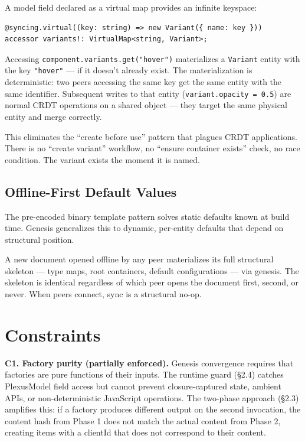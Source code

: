 A model field declared as a virtual map provides an infinite keyspace:

\begin{lstlisting}
@syncing.virtual((key: string) => new Variant({ name: key }))
accessor variants!: VirtualMap<string, Variant>;
\end{lstlisting}

Accessing \texttt{component.variants.get("hover")} materializes a \texttt{Variant} entity with the key \texttt{"hover"} --- if it doesn't already exist. The materialization is deterministic: two peers accessing the same key get the same entity with the same identifier. Subsequent writes to that entity (\texttt{variant.opacity = 0.5}) are normal CRDT operations on a shared object --- they target the same physical entity and merge correctly.

This eliminates the ``create before use'' pattern that plagues CRDT applications. There is no ``create variant'' workflow, no ``ensure container exists'' check, no race condition. The variant exists the moment it is named.

\subsection{Offline-First Default Values}

The pre-encoded binary template pattern\cite{yjs:forum:offlineinit, automerge:modeling} solves static defaults known at build time. Genesis generalizes this to dynamic, per-entity defaults that depend on structural position.

A new document opened offline by any peer materializes its full structural skeleton --- type maps, root containers, default configurations --- via genesis. The skeleton is identical regardless of which peer opens the document first, second, or never. When peers connect, sync is a structural no-op.

\section{Constraints}

\textbf{C1. Factory purity (partially enforced).} Genesis convergence requires that factories are pure functions of their inputs. The runtime guard (\S2.4) catches PlexusModel field access but cannot prevent closure-captured state, ambient APIs, or non-deterministic JavaScript operations. The two-phase approach (\S2.3) amplifies this: if a factory produces different output on the second invocation, the content hash from Phase 1 does not match the actual content from Phase 2, creating items with a clientId that does not correspond to their content.

